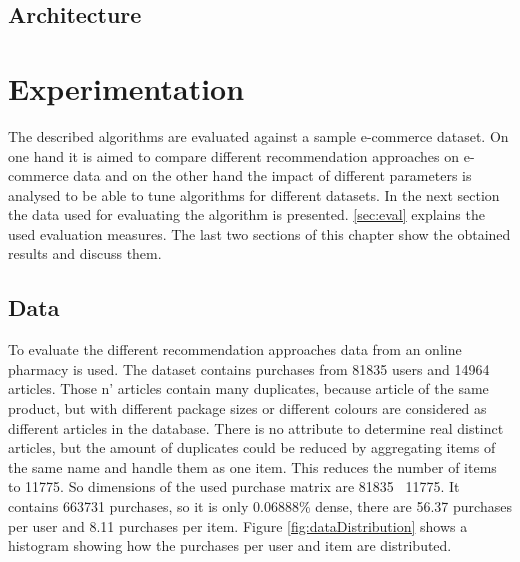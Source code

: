 \documentclass[10pt]{reportMaster}
\begin{document}
\section{Architecture}








\chapter{Experimentation}

The described algorithms are evaluated against a sample e-commerce dataset.
On one hand it is aimed to compare different recommendation approaches on e-commerce data and on the other hand the impact of different parameters is analysed to be able to tune algorithms for different datasets.
In the next section the data used for evaluating the algorithm is presented.
\ref{sec:eval} explains the used evaluation measures.
The last two sections of this chapter show the obtained results and discuss them.

\section{Data}
To evaluate the different recommendation approaches data from an online pharmacy is used.
The dataset contains purchases from 81835 users and 14964 articles.
Those n' articles contain many duplicates, because article of the same product, but with different package sizes or different colours are considered as different articles in the database.
There is no attribute to determine real distinct articles, but the amount of duplicates could be reduced by aggregating items of the same name and handle them as one item.
This reduces the number of items to 11775.
So dimensions of the used purchase matrix are 81835 \texttimes \ 11775.
It contains 663731 purchases, so it is only 0.06888\% dense, there are 56.37 purchases per user and 8.11 purchases per item. %
Figure \ref{fig:dataDistribution} shows a histogram showing how the purchases per user and item are distributed.

\end{document}
